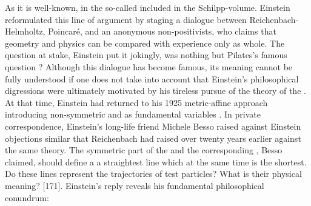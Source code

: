 \documentclass[draft]{article}
\begin{document}
As it is well-known, in the so-called  included in the Schilpp-volume. Einstein reformulated this line of argument by staging a dialogue between Reichenbach-Helmholtz, Poincaré, and an anonymous non-positivists, who claims that geometry and physics can be compared with experience only as whole. The question at stake, Einstein put it jokingly, was nothing but Pilates's famous question ? Although this dialogue has become  famous, its meaning cannot be fully understood if one does not take into account that Einstein's philosophical digressions were ultimately motivated by his tireless pursue of the theory of the . At that time, Einstein had returned to his 1925 metric-affine approach introducing non-symmetric \gmn and \Gtmn as fundamental variables \cite{Einstein1945,Einstein1945-04}. In private correspondence, Einstein's long-life friend Michele Besso raised against Einstein objections similar that Reichenbach had raised over twenty years earlier against the same theory. The symmetric part of the \gmn and the corresponding \Gtmn, Besso claimed, should define a a straightest line which at the same time is the shortest. Do these lines represent the trajectories of test particles? What is their physical meaning? [171]. Einstein's reply reveals his fundamental philosophical conundrum:

\end{document}
